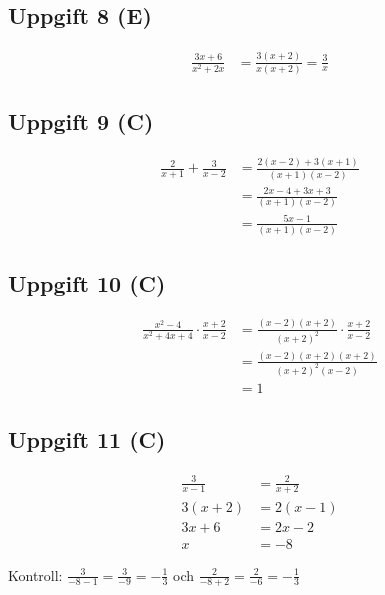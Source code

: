 \documentclass[12pt]{article}
\begin{document}
\subsection*{Uppgift 8 (E)}
\begin{facitbox}
\begin{align*}
\frac{3x + 6}{x^2 + 2x} &= \frac{3(x + 2)}{x(x + 2)} = \frac{3}{x}
\end{align*}
\end{facitbox}

\subsection*{Uppgift 9 (C)}
\begin{facitbox}
\begin{align*}
\frac{2}{x + 1} + \frac{3}{x - 2} &= \frac{2(x - 2) + 3(x + 1)}{(x + 1)(x - 2)} \\
&= \frac{2x - 4 + 3x + 3}{(x + 1)(x - 2)} \\
&= \frac{5x - 1}{(x + 1)(x - 2)}
\end{align*}
\end{facitbox}

\subsection*{Uppgift 10 (C)}
\begin{facitbox}
\begin{align*}
\frac{x^2 - 4}{x^2 + 4x + 4} \cdot \frac{x + 2}{x - 2} &= \frac{(x - 2)(x + 2)}{(x + 2)^2} \cdot \frac{x + 2}{x - 2} \\
&= \frac{(x - 2)(x + 2)(x + 2)}{(x + 2)^2(x - 2)} \\
&= 1
\end{align*}
\end{facitbox}

\subsection*{Uppgift 11 (C)}
\begin{facitbox}
\begin{align*}
\frac{3}{x - 1} &= \frac{2}{x + 2} \\
3(x + 2) &= 2(x - 1) \\
3x + 6 &= 2x - 2 \\
x &= -8
\end{align*}

Kontroll: $\frac{3}{-8 - 1} = \frac{3}{-9} = -\frac{1}{3}$ och $\frac{2}{-8 + 2} = \frac{2}{-6} = -\frac{1}{3}$ \checkmark
\end{facitbox}
\end{document}
